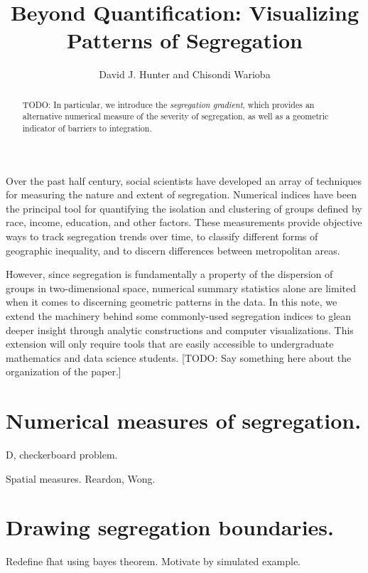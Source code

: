 \documentclass{article}
\theoremstyle{theorem}
\theoremstyle{definition}
\begin{document}
\title{Beyond Quantification: Visualizing Patterns of Segregation}
\author{David J. Hunter and Chisondi Warioba}

\maketitle

\begin{abstract}
  TODO: In particular, we introduce the \textit{segregation gradient}, which provides an alternative numerical measure of the severity of segregation, as well as a geometric indicator of barriers to integration.
\end{abstract}

\noindent Over the past half century, social scientists have developed an array of techniques for measuring the nature and extent of segregation. \cite{example1} Numerical indices have been the principal tool for quantifying the isolation and clustering of groups defined by race, income, education, and other factors. These measurements provide objective ways to track segregation trends over time, to classify different forms of geographic inequality, and to discern differences between metropolitan areas.

However, since segregation is fundamentally a property of the dispersion of groups in two-dimensional space, numerical summary statistics alone are limited when it comes to discerning geometric patterns in the data. In this note, we extend the machinery behind some commonly-used segregation indices to glean deeper insight through analytic constructions and computer visualizations. This extension will only require tools that are easily accessible to undergraduate mathematics and data science students.  [TODO: Say something here about the organization of the paper.]

\section{Numerical measures of segregation.}

D, checkerboard problem.

Spatial measures. Reardon, Wong.

\section{Drawing segregation boundaries.}

Redefine fhat using bayes theorem. Motivate by simulated example.
\end{document}
